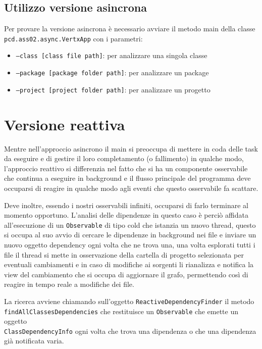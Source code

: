 \documentclass[11pt,notitlepage]{article}
\begin{document}
\subsection{Utilizzo versione asincrona}
Per provare la versione asincrona è necessario avviare il metodo main della classe \texttt{pcd.ass02.async.VertxApp} con i parametri:
\begin{itemize}
    \item \texttt{--class [class file path]}: per analizzare una singola classe
    \item \texttt{--package [package folder path]}: per analizzare un package
    \item \texttt{--project [project folder path]}: per analizzare un progetto
\end{itemize}

\section{Versione reattiva}
Mentre nell'approccio asincrono il main si preoccupa di mettere in coda delle task da eseguire e di gestire il loro completamento (o fallimento) in qualche modo, 
l'approccio reattivo si differenzia nel fatto che si ha un componente osservabile che continua a eseguire in background e il flusso principale del programma deve 
occuparsi di reagire in qualche modo agli eventi che questo osservabile fa scattare. 

Deve inoltre, essendo i nostri osservabili infiniti, occuparsi di farlo terminare al momento opportuno. L'analisi delle dipendenze in questo caso è perciò affidata 
all'esecuzione di un \texttt{Observable} di tipo cold che istanzia un nuovo thread, questo si occupa al suo avvio di cercare le dipendenze in background nei file 
e inviare un nuovo oggetto dependency ogni volta che ne trova una, una volta esplorati tutti i file il thread si mette in osservazione della cartella di progetto
selezionata per eventuali cambiamenti e in caso di modifiche ai sorgenti li rianalizza e notifica la view del cambiamento che si occupa di aggiornare il grafo, 
permettendo così di reagire in tempo reale a modifiche dei file. 

La ricerca avviene chiamando sull'oggetto \texttt{ReactiveDependencyFinder} il metodo \\
\texttt{findAllClassesDependencies} che restituisce un \texttt{Observable} che emette un oggetto \\
\texttt{ClassDependencyInfo} ogni volta che trova una dipendenza o che una dipendenza già notificata varia.
\end{document}
